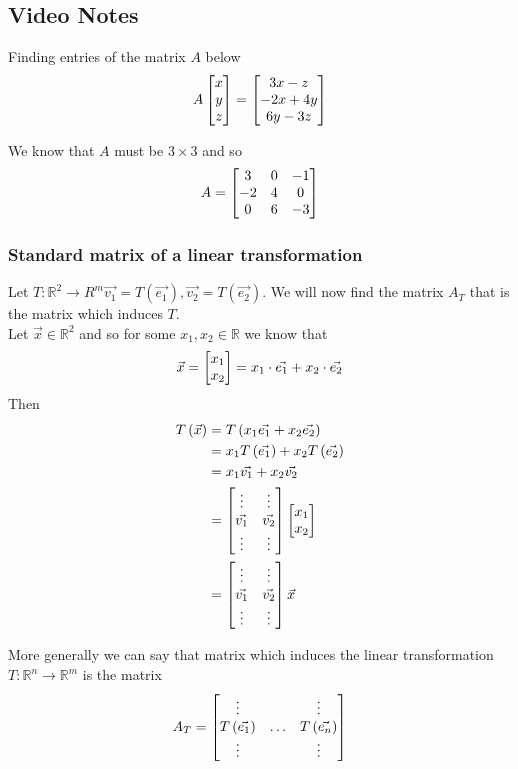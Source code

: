 \documentclass[11pt]{book}
\begin{document}

\subsection{Video Notes}%
\label{sub:video_notes}

Finding entries of the matrix $A$ below
\[
A \begin{bmatrix} x \\ y \\ z \end{bmatrix} = \begin{bmatrix} 3x  - z \\ -2x + 4y \\ 6y  - 3z \end{bmatrix} 
\]

We know that $A$ must be $3\times 3$ and so 
\[
A= \begin{bmatrix} 3 & 0 & -1 \\ -2 & 4 & 0 \\ 0 & 6 & -3 \end{bmatrix}
\]

\subsubsection{Standard matrix of a linear transformation}%
\label{ssub:standard_matrix_of_a_linear_transformation}

Let $T : \mathbb{R}^2  \to R^{m} \vec{v_1} = T\left(\vec{e_1} \right), \vec{v_2} = T\left(\vec{e_2} \right)$. We will now find the matrix $A_{T} $ that is the matrix which induces $T$. \\
Let $\vec{x} \in \mathbb{R}^2 $ and so for some $x_1, x_2\in \mathbb{R}$ we know that 
\[
\vec{x} = \begin{bmatrix} x_1 \\ x_2 \end{bmatrix} = x_1 \cdot \vec{e_1}  + x_2 \cdot \vec{e_2} 
\]
Then 
\begin{align*}
    T\left(\vec{x} \right) &= T\left(x_1\vec{e_1}  + x_2\vec{e_2} \right)  \\ 
    &= x_1T\left(\vec{e_1} \right) + x_2T\left(\vec{e_2} \right)  \\ 
    &= x_1\vec{v_1}  + x_2\vec{v_2} \\
    &= \begin{bmatrix} \vdots & \vdots \\ \vec{v_1}  & \vec{v_2}  \\ \vdots & \vdots \end{bmatrix} \begin{bmatrix} x_1 \\ x_2 \end{bmatrix}\\
    &= \begin{bmatrix} \vdots & \vdots \\ \vec{v_1}  & \vec{v_2}  \\ \vdots & \vdots \end{bmatrix}\vec{x} 
\end{align*}

More generally we can say that matrix which induces the linear transformation $T : \mathbb{R} ^{n}  \to \mathbb{R} ^{m}  $ is the matrix
\[
A_{T} = \begin{bmatrix} \vdots &  & \vdots \\ T\left(\vec{e_1} \right) & \ldots & T\left(\vec{e_{n} } \right) \\ \vdots &  & \vdots \end{bmatrix}
\]
\end{document}
